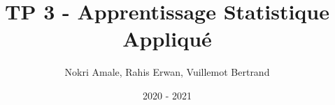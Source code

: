 \documentclass{article}
\title{TP 3 - Apprentissage Statistique Appliqué}
\date{2020 - 2021}
\author{Nokri Amale, Rahis Erwan, Vuillemot Bertrand}
\begin{document}
\maketitle{}





\newpage
\nocite{*}


\end{document}
